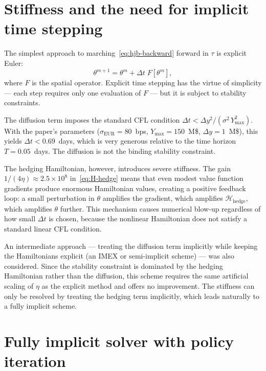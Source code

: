\section{Stiffness and the need for implicit time stepping}
\label{sec:pde-stiffness}

The simplest approach to marching~\eqref{eq:hjb-backward} forward in $\tau$ is explicit Euler:
\begin{equation}
  \label{eq:explicit-euler}
  \theta^{m+1} = \theta^m + \Delta t\; F[\theta^m],
\end{equation}
where $F$ is the spatial operator. Explicit time stepping has the virtue of simplicity — each step requires only one evaluation of $F$ — but it is subject to stability constraints.

The diffusion term imposes the standard CFL condition $\Delta t < \Delta y^2 / (\sigma^2\,Y_{\max}^2)$. With the paper's parameters ($\sigma_{\text{EUR}} = 80$~bps, $Y_{\max} = 150$~M\$, $\Delta y = 1$~M\$), this yields $\Delta t < 0.69$~days, which is very generous relative to the time horizon $T = 0.05$~days. The diffusion is not the binding stability constraint.

The hedging Hamiltonian, however, introduces severe stiffness. The gain $1/(4\eta) \approx 2.5 \times 10^8$ in~\eqref{eq:H-hedge} means that even modest value function gradients produce enormous Hamiltonian values, creating a positive feedback loop: a small perturbation in $\theta$ amplifies the gradient, which amplifies $\mathcal{H}_{\text{hedge}}$, which amplifies $\theta$ further. This mechanism causes numerical blow-up regardless of how small $\Delta t$ is chosen, because the nonlinear Hamiltonian does not satisfy a standard linear CFL condition.

An intermediate approach --- treating the diffusion term implicitly while keeping the Hamiltonians explicit (an IMEX or semi-implicit scheme) --- was also considered. Since the stability constraint is dominated by the hedging Hamiltonian rather than the diffusion, this scheme requires the same artificial scaling of $\eta$ as the explicit method and offers no improvement. The stiffness can only be resolved by treating the hedging term implicitly, which leads naturally to a fully implicit scheme.


\section{Fully implicit solver with policy iteration}
\label{sec:pde-implicit}


